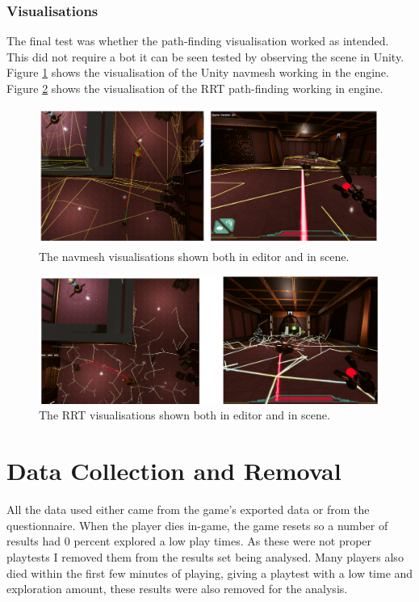 \documentclass[journal]{IEEEtran}
\begin{document}
	\subsubsection{Visualisations}
	The final test was whether the path-finding visualisation worked as intended. This did not require a bot it can be seen tested by observing the scene in Unity. Figure \ref{image:navmeshVisuals} shows the visualisation of the Unity navmesh working in the engine.  Figure \ref{image:RRTVisuals} shows the visualisation of the RRT path-finding working in engine.
	
	\begin{figure}[h]
		\includegraphics[width=1.0\linewidth]{NavmeshVis.png}
		\caption{The navmesh visualisations shown both in editor and in scene.}
		\label{image:navmeshVisuals}
	\end{figure}  
	
	
	\begin{figure}[h]
		\includegraphics[width=1.0\linewidth]{RRTVis.png}
		\caption{The RRT visualisations shown both in editor and in scene.}
		\label{image:RRTVisuals}
	\end{figure}  
	
	\section{Data Collection and Removal}
	All the data used either came from the game's exported data or from the questionnaire. When the player dies in-game, the game resets so a number of results had 0 percent explored a low play times. As these were not proper playtests I removed them from the results set being analysed.  Many players also died within the first few minutes of playing, giving a playtest with a low time and exploration amount, these results were also removed for the analysis.
	
\end{document}
